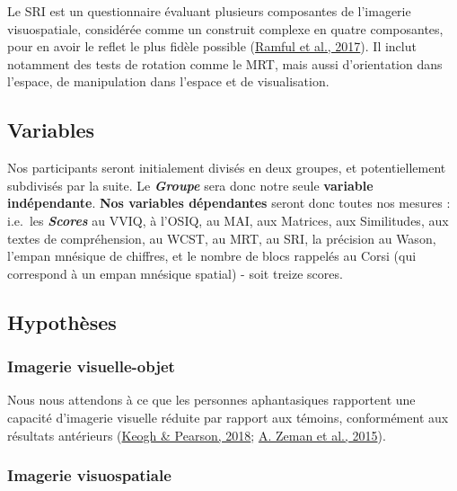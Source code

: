 \documentclass[
  12pt,
]{article}
\begin{document}
Le SRI est un questionnaire évaluant plusieurs composantes de l'imagerie
visuospatiale, considérée comme un construit complexe en quatre
composantes, pour en avoir le reflet le plus fidèle possible
(\protect\hyperlink{ref-ramfulMeasurementSpatialAbility2017}{Ramful et
al., 2017}). Il inclut notamment des tests de rotation comme le MRT,
mais aussi d'orientation dans l'espace, de manipulation dans l'espace et
de visualisation.

\hypertarget{variables}{%
\subsection{Variables}\label{variables}}

Nos participants seront initialement divisés en deux groupes, et
potentiellement subdivisés par la suite. Le \textbf{\emph{Groupe}} sera
donc notre seule \textbf{variable indépendante}. \textbf{Nos variables
dépendantes} seront donc toutes nos mesures : i.e.~les
\textbf{\emph{Scores}} au VVIQ, à l'OSIQ, au MAI, aux Matrices, aux
Similitudes, aux textes de compréhension, au WCST, au MRT, au SRI, la
précision au Wason, l'empan mnésique de chiffres, et le nombre de blocs
rappelés au Corsi (qui correspond à un empan mnésique spatial) - soit
treize scores.

\hypertarget{hypothuxe8ses}{%
\subsection{Hypothèses}\label{hypothuxe8ses}}

\hypertarget{imagerie-visuelle-objet}{%
\subsubsection{Imagerie visuelle-objet}\label{imagerie-visuelle-objet}}

Nous nous attendons à ce que les personnes aphantasiques rapportent une
capacité d'imagerie visuelle réduite par rapport aux témoins,
conformément aux résultats antérieurs
(\protect\hyperlink{ref-keoghBlindMindNo2018}{Keogh \& Pearson, 2018};
\protect\hyperlink{ref-zemanLivesImageryCongenital2015}{A. Zeman et al.,
2015}).

\hypertarget{imagerie-visuospatiale}{%
\subsubsection{Imagerie visuospatiale}\label{imagerie-visuospatiale}}
\end{document}
